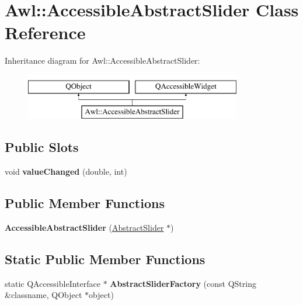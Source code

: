 \hypertarget{class_awl_1_1_accessible_abstract_slider}{}\section{Awl\+:\+:Accessible\+Abstract\+Slider Class Reference}
\label{class_awl_1_1_accessible_abstract_slider}
Inheritance diagram for Awl\+:\+:Accessible\+Abstract\+Slider\+:\begin{figure}[H]
\begin{center}
\leavevmode
\includegraphics[height=2.000000cm]{class_awl_1_1_accessible_abstract_slider}
\end{center}
\end{figure}
\subsection*{Public Slots}
\begin{DoxyCompactItemize}
\item 
\mbox{\label{class_awl_1_1_accessible_abstract_slider_a1975d8e08f0063d424b550eb0c5fc2c1}} 
void {\bfseries value\+Changed} (double, int)
\end{DoxyCompactItemize}
\subsection*{Public Member Functions}
\begin{DoxyCompactItemize}
\item 
\mbox{\label{class_awl_1_1_accessible_abstract_slider_a738ef35055256b2d49610f6aa2c4265d}} 
{\bfseries Accessible\+Abstract\+Slider} (\hyperlink{class_awl_1_1_abstract_slider}{Abstract\+Slider} $\ast$)
\end{DoxyCompactItemize}
\subsection*{Static Public Member Functions}
\begin{DoxyCompactItemize}
\item 
\mbox{\label{class_awl_1_1_accessible_abstract_slider_a1c4a8f49370a402ad6524ff5106ec3f1}} 
static Q\+Accessible\+Interface $\ast$ {\bfseries Abstract\+Slider\+Factory} (const Q\+String \&classname, Q\+Object $\ast$object)
\end{DoxyCompactItemize}


